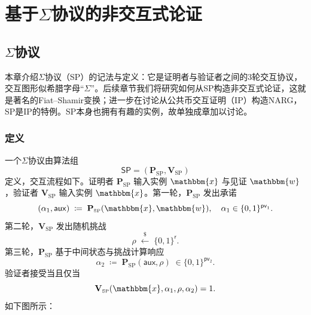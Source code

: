 \documentclass[american,singlepageview]{snargs-book-zh}
\newcommand{\Bits}{\{0,1\}}
\newcommand{\DefineEqual}{\coloneqq}
\newcommand{\AuxiliaryState}{\mathsf{aux}}
\newcommand{\Instance}{\mathbbm{x}}
\newcommand{\Witness}{\mathbbm{w}}
\newcommand{\ProtoProver}{P}
\newcommand{\ProtoVerifier}{V}
\newcommand{\ProtoRandomnessComplexity}{\mathsf{r}}
\newcommand{\ProtoPToVComplexity}{\mathsf{pv}}
\newcommand{\SPSymbol}{\mathsf{SP}}
\newcommand{\SPSubscript}{\scriptscriptstyle\mathrm{SP}}
\newcommand{\SPFormat}[1]{\mathbf{#1}}
\newcommand{\SPProver}{\SPFormat{\ProtoProver}_{\SPSubscript}}
\newcommand{\SPVerifier}{\SPFormat{\ProtoVerifier}_{\SPSubscript}}
\newcommand{\SPSystem}{(\SPProver,\SPVerifier)}
\newcommand{\SPCommitment}{\alpha_{1}}
\newcommand{\SPChallenge}{\rho}
\newcommand{\SPResponse}{\alpha_{2}}
\newcommand{\SPPToVComplexity}{\ProtoPToVComplexity}
\newcommand{\SPRandomnessComplexity}{\ProtoRandomnessComplexity}
\begin{document}
\part{基于$\Sigma$协议的非交互式论证}
\label{part:narg-from-sp}


\chapter{$\Sigma$协议}
\label{chapter:sp}

本章介绍$\Sigma$协议（SP）的记法与定义：它是证明者与验证者之间的$3$轮交互协议，交互图形似希腊字母“$\Sigma$”。后续章节我们将研究如何从SP构造非交互式论证，这就是著名的Fiat–Shamir变换；进一步在讨论从公共币交互证明（IP）构造NARG，SP是IP的特例。SP本身也拥有有趣的实例，故单独成章加以讨论。

\section{定义}
\label{section:definition-of-sp}

一个$\Sigma$协议由算法组
\[
  \SPSymbol=\SPSystem
\]
定义，交互流程如下。证明者 $\SPProver$ 输入实例 $\Instance$ 与见证 $\Witness$，验证者 $\SPVerifier$ 输入实例 $\Instance$。第一轮，$\SPProver$ 发出承诺
\[
  (\SPCommitment,\AuxiliaryState)\;\DefineEqual\;\SPProver(\Instance,\Witness),
  \quad \SPCommitment\in\Bits^{\SPPToVComplexity_{1}}.
\]
第二轮，$\SPVerifier$ 发出随机挑战
\[
  \SPChallenge\;\overset{\$}{\leftarrow}\;\Bits^{\SPRandomnessComplexity}.
\]
第三轮，$\SPProver$ 基于中间状态与挑战计算响应
\[
  \SPResponse\;\DefineEqual\;\SPProver(\AuxiliaryState,\SPChallenge)
  \;\in\Bits^{\SPPToVComplexity_{2}}.
\]
验证者接受当且仅当
\[
  \SPVerifier(\Instance,\SPCommitment,\SPChallenge,\SPResponse)=1.
\]
如下图所示：
\end{document}

